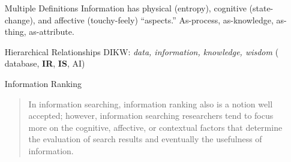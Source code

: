 \documentclass{article}
\newcommand{\note}[1]{{\footnotesize #1}}
\newcommand{\hiii}[1]{{\it #1}}
\begin{document}
\begin{itemize}
    {\bf People -- Information Searching}
    \begin{itemize}
        \item \hiii{Least Effort}
        \item \hiii{Iterative Process}
    \end{itemize}

    {\bf People -- Both}
    \begin{itemize}
        \item \hiii{Interaction}
        \item \hiii{Resolving an Uncertainty}
    \end{itemize}

    {\bf People -- Information Retrieval}
    \begin{itemize}
        \item \hiii{Provision} (assumed that providing information helps a user accomplish some task)
    \end{itemize}

    {\bf Technology -- Information Searching}
    \begin{itemize}
        \item \hiii{Channel Preference}
    \end{itemize}

    {\bf Technology -- Both}
    \begin{itemize}
        \item \hiii{Information Obtainability}
    \end{itemize}

    {\bf Technology -- Information Retrieval}
    \begin{itemize}
        \item \hiii{Query} (transformed input)
        \item \hiii{Neutrality of Technology}
        \item \hiii{Memex Vision}
    \end{itemize}

    \item[Multiple Definitions] Information has physical (entropy), cognitive (state-change), and affective (touchy-feely) ``aspects.''  As-process, as-knowledge, as-thing, as-attribute.

    \item[Hierarchical Relationships] DIKW: {\it data, information, knowledge, wisdom} (\note{ database, {\bf IR}, {\bf IS}, AI})

    \item[Information Ranking]
        \begin{quote}
            In information searching, information ranking also is a notion well accepted; however, information searching researchers tend to focus more on the cognitive, affective, or contextual factors that determine the evaluation of search results and eventually the usefulness of information.
        \end{quote}


\end{itemize}
\end{document}
